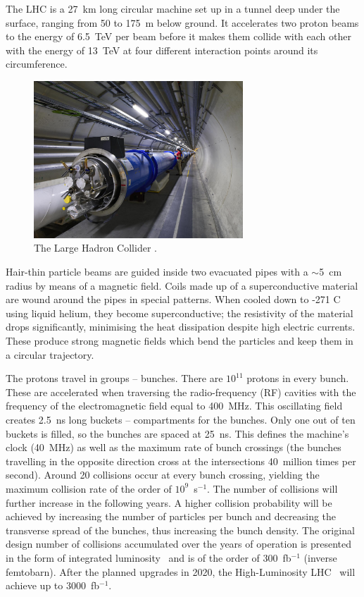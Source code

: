 The LHC is a 27~km long circular machine set up in a tunnel deep under the surface, ranging from 50 to 175~m below ground. It accelerates two proton beams to the energy of 6.5~TeV per beam before it makes them collide with each other with the energy of 13~TeV at four different interaction points around its circumference. 
\begin{figure}[!t]
\centering
\includegraphics[width=0.7\textwidth]{01_introduction/pics/lhc}
\caption{The Large Hadron Collider \cite{Maximilien:1324852}.}
\label{fig:lhc}
\end{figure}
Hair-thin particle beams are guided inside two evacuated pipes with a $\sim$5~cm radius by means of a magnetic field. Coils made up of a superconductive material are wound around the pipes in special patterns. When cooled down to -271 \textdegree C using liquid helium, they become superconductive; the resistivity of the material drops significantly, minimising the heat dissipation despite high electric currents. These produce strong magnetic fields which bend the particles and keep them in a circular trajectory. 

The protons travel in groups -- bunches. There are $10^{11}$ protons in every bunch. These are accelerated when traversing the radio-frequency (RF) cavities with the frequency of the electromagnetic field equal to 400~MHz. This oscillating field creates 2.5~ns long buckets -- compartments for the bunches. Only one out of ten buckets is filled, so the bunches are spaced at 25~ns. This defines the machine's clock (40~MHz) as well as the maximum rate of bunch crossings (the bunches travelling in the opposite direction cross at the intersections 40~million times per second). Around 20 collisions occur at every bunch crossing, yielding the maximum collision rate of the order of $10^9$~s$^{-1}$. The number of collisions will further increase in the following years. A higher collision probability will be achieved by increasing the number of particles per bunch and decreasing the transverse spread of the bunches, thus increasing the bunch density. The original design number of collisions accumulated over the years of operation is presented in the form of integrated luminosity~\cite{Herr:1625184} and is of the order of 300~fb$^{-1}$ (inverse femtobarn). After the planned upgrades in 2020, the High-Luminosity LHC~\cite{BejarAlonso:2069130} will achieve up to 3000~fb$^{-1}$.


